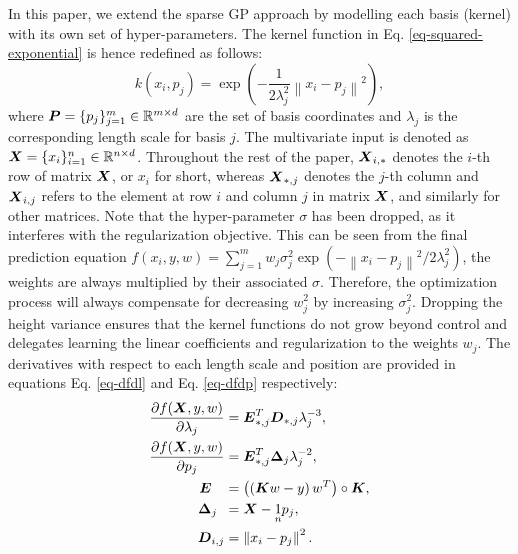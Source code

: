 \documentclass[useAMS,usenatbib,fleqn]{mn2e}
\begin{document}
In this paper, we extend the sparse GP approach by modelling each basis (kernel) with its own set of hyper-parameters. The kernel function in Eq. \eqref{eq-squared-exponential} is hence redefined as follows:
\begin{equation}
\label{eq-squared-exponential-extension}
k(x_{i},p_{j}) = \exp{\left(-\frac{1}{2\lambda_{j}^{2}}\left\| x_{i}-p_{j}\right\|^{2}\right)},
\end{equation}
where $\bmath{P}=\{p_{j}\}_{j=1}^{m} \in \mathbb{R}^{m\times d}$ are the set of basis coordinates and $\lambda_{j}$ is the corresponding length scale for basis $j$. The multivariate input is denoted as $\bmath{X}=\{x_{i}\}_{i=1}^{n} \in \mathbb{R}^{n\times d}$. Throughout the rest of the paper, $\bmath{X}_{i,*}$ denotes the $i$-th row of matrix $\bmath{X}$, or $x_{i}$ for short, whereas $\bmath{X}_{*,j}$ denotes the $j$-th column and $\bmath{X}_{i,j}$ refers to the element at row $i$ and column $j$ in matrix $\bmath{X}$, and similarly for other matrices. Note that the hyper-parameter $\sigma$ has been dropped, as it interferes with the regularization objective. This can be seen from the final prediction equation $f(x_{i},y,w)=\sum_{j=1}^{m}w_{j}\sigma_{j}^{2}\exp{\left(-\left\| x_{i}-p_{j}\right\|^{2}/2\lambda_{j}^{2}\right)}$, the weights are always multiplied by their associated $\sigma$. Therefore, the optimization process will always compensate for decreasing $w_{j}^{2}$ by increasing $\sigma_{j}^{2}$. Dropping the height variance ensures that the kernel functions do not grow beyond control and delegates learning the linear coefficients and regularization to the weights $w_{j}$. The derivatives with respect to each length scale and position are provided in equations Eq. \eqref{eq-dfdl} and Eq. \eqref{eq-dfdp} respectively:
\begin{subequations}
\begin{align}
\label{eq-dfdl}
\frac{\partial f(\bmath{X},y,w)}{\partial \lambda_{j}} &=\bmath{E}_{*,j}^{T}\bmath{D}_{*,j}\lambda_{j}^{-3},\\
\label{eq-dfdp}
\frac{\partial f(\bmath{X},y,w)}{\partial p_{j}} &=\bmath{E}_{*,j}^{T}\mathbf\Delta_{j}\lambda_{j}^{-2},\\
\bmath{E}\phantom{_{i,j}} &= \left(\left(\bmath{K}w-y\right)w^{T}\right)\circ\bmath{K},\\
\mathbf\Delta_{j\phantom{,i}} &= \bmath{X}-\underset{n}{1}p_{j},\\
\bmath{D}_{i,j} &= \left \| x_{i}-p_{j}\right\|^{2}.
\end{align}
\end{subequations}
\end{document}
